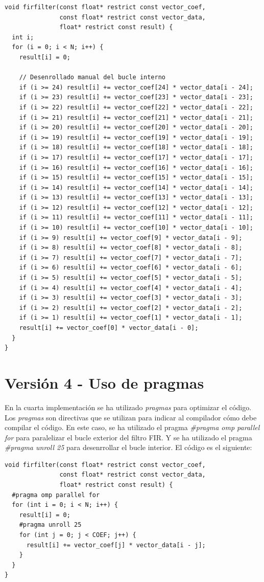 \documentclass[11pt]{report}
\begin{document}
\begin{lstlisting}
void firfilter(const float* restrict const vector_coef, 
               const float* restrict const vector_data, 
               float* restrict const result) {
  int i;
  for (i = 0; i < N; i++) {
    result[i] = 0;

    // Desenrollado manual del bucle interno
    if (i >= 24) result[i] += vector_coef[24] * vector_data[i - 24];
    if (i >= 23) result[i] += vector_coef[23] * vector_data[i - 23];
    if (i >= 22) result[i] += vector_coef[22] * vector_data[i - 22];
    if (i >= 21) result[i] += vector_coef[21] * vector_data[i - 21];
    if (i >= 20) result[i] += vector_coef[20] * vector_data[i - 20];
    if (i >= 19) result[i] += vector_coef[19] * vector_data[i - 19];
    if (i >= 18) result[i] += vector_coef[18] * vector_data[i - 18];
    if (i >= 17) result[i] += vector_coef[17] * vector_data[i - 17];
    if (i >= 16) result[i] += vector_coef[16] * vector_data[i - 16];
    if (i >= 15) result[i] += vector_coef[15] * vector_data[i - 15];
    if (i >= 14) result[i] += vector_coef[14] * vector_data[i - 14];
    if (i >= 13) result[i] += vector_coef[13] * vector_data[i - 13];
    if (i >= 12) result[i] += vector_coef[12] * vector_data[i - 12];
    if (i >= 11) result[i] += vector_coef[11] * vector_data[i - 11];
    if (i >= 10) result[i] += vector_coef[10] * vector_data[i - 10];
    if (i >= 9) result[i] += vector_coef[9] * vector_data[i - 9];
    if (i >= 8) result[i] += vector_coef[8] * vector_data[i - 8];
    if (i >= 7) result[i] += vector_coef[7] * vector_data[i - 7];
    if (i >= 6) result[i] += vector_coef[6] * vector_data[i - 6];
    if (i >= 5) result[i] += vector_coef[5] * vector_data[i - 5];
    if (i >= 4) result[i] += vector_coef[4] * vector_data[i - 4];
    if (i >= 3) result[i] += vector_coef[3] * vector_data[i - 3];
    if (i >= 2) result[i] += vector_coef[2] * vector_data[i - 2];
    if (i >= 1) result[i] += vector_coef[1] * vector_data[i - 1];
    result[i] += vector_coef[0] * vector_data[i - 0];
  }
}
\end{lstlisting}

\newpage

\section{Versión 4 - Uso de pragmas}
En la cuarta implementación se ha utilizado \emph{pragmas} para optimizar el código. Los \emph{pragmas} son directivas que se utilizan para
indicar al compilador cómo debe compilar el código. En este caso, se ha utilizado el pragma \emph{\#pragma omp parallel for} para paralelizar el bucle
exterior del filtro FIR. Y se ha utilizado el pragma \emph{\#pragma unroll 25} para desenrrollar el bucle interior. El código es el siguiente:
\begin{lstlisting}
void firfilter(const float* restrict const vector_coef, 
               const float* restrict const vector_data,
               float* restrict const result) {
  #pragma omp parallel for
  for (int i = 0; i < N; i++) {
    result[i] = 0;
    #pragma unroll 25
    for (int j = 0; j < COEF; j++) {
      result[i] += vector_coef[j] * vector_data[i - j];
    }
  }
}
\end{lstlisting}
\end{document}
